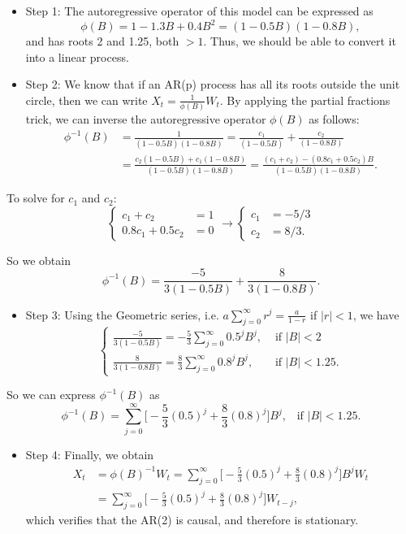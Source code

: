 \documentclass[]{book}
\providecommand{\tightlist}{%
  \setlength{\itemsep}{0pt}\setlength{\parskip}{0pt}}
\theoremstyle{definition}
\theoremstyle{definition}
\theoremstyle{definition}
\theoremstyle{remark}
\begin{document}
\begin{itemize}
\item
  Step 1: The autoregressive operator of this model can be expressed as
  \[
  \phi(B) = 1-1.3B+0.4B^2 = (1-0.5B)(1-0.8B),
  \] and has roots 2 and 1.25, both \(>1\). Thus, we should be able to
  convert it into a linear process.
\item
  Step 2: We know that if an AR(p) process has all its roots outside the
  unit circle, then we can write \(X_t = \frac{1}{\phi(B)} W_t\). By
  applying the partial fractions trick, we can inverse the
  autoregressive operator \(\phi(B)\) as follows: \[ \begin{aligned}
  \phi^{-1}(B) &= \frac{1}{(1-0.5B)(1-0.8B)} = \frac{c_1}{(1-0.5B)} + \frac{c_2}{(1-0.8B)} \\
  &= \frac{c_2(1-0.5B) + c_1(1-0.8B)}{(1-0.5B)(1-0.8B)} = \frac{(c_1 + c_2)-(0.8c_1+0.5c_2)B}{(1-0.5B)(1-0.8B)}.
  \end{aligned} \]
\end{itemize}

To solve for \(c_1\) and \(c_2\): \[ \begin{cases}
      c_1 + c_2 &=1\\
      0.8c_1+0.5c_2 &=0
\end{cases} \to 
\begin{cases}
      c_1 &= -5/3\\
      c_2 &= 8/3.
\end{cases} \]

So we obtain \[
\phi^{-1}(B) = \frac{-5}{3(1-0.5B)} + \frac{8}{3(1-0.8B)}.
\]

\begin{itemize}
\tightlist
\item
  Step 3: Using the Geometric series, i.e.
  \(a\sum_{j=0}^{\infty} r^j = \frac{a}{1-r}\) if \(|r| <1\), we have
  \[ \begin{cases}
    \frac{-5}{3(1-0.5B)} = -\frac{5}{3} \sum_{j=0}^\infty 0.5^j B^j, &\mbox{ if } |B| < 2 \\
    \frac{8}{3(1-0.8B)} = \frac{8}{3} \sum_{j=0}^\infty 0.8^j B^j, &\mbox{ if } |B| < 1.25.
  \end{cases} \]
\end{itemize}

So we can express \(\phi^{-1}(B)\) as \[
\phi^{-1}(B) = \sum_{j=0}^\infty \Big[ -\frac{5}{3} (0.5)^j  + \frac{8}{3} (0.8)^j \Big] B^j, \;\;\; \text{if  } |B|<1.25.
\]

\begin{itemize}
\tightlist
\item
  Step 4: Finally, we obtain \[ \begin{aligned}
  X_t &= \phi(B)^{-1} W_t = \sum_{j=0}^\infty \Big[ -\frac{5}{3} (0.5)^j  + \frac{8}{3} (0.8)^j \Big] B^j W_t \\
  &= \sum_{j=0}^\infty \Big[ -\frac{5}{3} (0.5)^j  + \frac{8}{3} (0.8)^j \Big] W_{t-j},
  \end{aligned} \] which verifies that the AR(2) is causal, and
  therefore is stationary.

\end{itemize}
\end{document}
